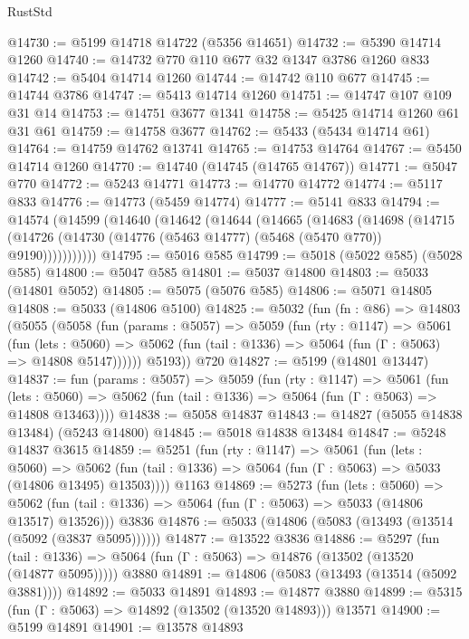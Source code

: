 \begin{lexlean}{RustStd}
\begin{coremodule}
@14730 := @5199 @14718 @14722 (@5356 @14651)
@14732 := @5390 @14714 @1260
@14740 := @14732 @770 @110 @677 @32 @1347 @3786 @1260 @833
@14742 := @5404 @14714 @1260
@14744 := @14742 @110 @677
@14745 := @14744 @3786
@14747 := @5413 @14714 @1260
@14751 := @14747 @107 @109 @31 @14
@14753 := @14751 @3677 @1341
@14758 := @5425 @14714 @1260 @61 @31 @61
@14759 := @14758 @3677
@14762 := @5433 (@5434 @14714 @61)
@14764 := @14759 @14762 @13741
@14765 := @14753 @14764
@14767 := @5450 @14714 @1260
@14770 := @14740 (@14745 (@14765 @14767))
@14771 := @5047 @770
@14772 := @5243 @14771
@14773 := @14770 @14772
@14774 := @5117 @833
@14776 := @14773 (@5459 @14774)
@14777 := @5141 @833
@14794 := @14574
    (@14599
      (@14640
        (@14642
          (@14644
            (@14665
              (@14683
                (@14698
                  (@14715
                    (@14726 (@14730 (@14776 (@5463 @14777) (@5468 (@5470 @770)) @9190)))))))))))
@14795 := @5016 @585
@14799 := @5018 (@5022 @585) (@5028 @585)
@14800 := @5047 @585
@14801 := @5037 @14800
@14803 := @5033 (@14801 @5052)
@14805 := @5075 (@5076 @585)
@14806 := @5071 @14805
@14808 := @5033 (@14806 @5100)
@14825 := @5032
    (fun (fn : @86) =>
    @14803
      (@5055
        (@5058
          (fun (params : @5057) =>
          @5059
            (fun (rty : @1147) =>
            @5061
              (fun (lets : @5060) =>
              @5062 (fun (tail : @1336) => @5064 (fun (Γ : @5063) => @14808 @5147))))))
        @5193))
    @720
@14827 := @5199 (@14801 @13447)
@14837 := fun (params : @5057) =>
  @5059
    (fun (rty : @1147) =>
    @5061
      (fun (lets : @5060) =>
      @5062 (fun (tail : @1336) => @5064 (fun (Γ : @5063) => @14808 @13463))))
@14838 := @5058 @14837
@14843 := @14827 (@5055 @14838 @13484) (@5243 @14800)
@14845 := @5018 @14838 @13484
@14847 := @5248 @14837 @3615
@14859 := @5251
    (fun (rty : @1147) =>
    @5061
      (fun (lets : @5060) =>
      @5062 (fun (tail : @1336) => @5064 (fun (Γ : @5063) => @5033 (@14806 @13495) @13503))))
    @1163
@14869 := @5273
    (fun (lets : @5060) =>
    @5062 (fun (tail : @1336) => @5064 (fun (Γ : @5063) => @5033 (@14806 @13517) @13526)))
    @3836
@14876 := @5033 (@14806 (@5083 (@13493 (@13514 (@5092 (@3837 @5095))))))
@14877 := @13522 @3836
@14886 := @5297
    (fun (tail : @1336) => @5064 (fun (Γ : @5063) => @14876 (@13502 (@13520 (@14877 @5095)))))
    @3880
@14891 := @14806 (@5083 (@13493 (@13514 (@5092 @3881))))
@14892 := @5033 @14891
@14893 := @14877 @3880
@14899 := @5315 (fun (Γ : @5063) => @14892 (@13502 (@13520 @14893))) @13571
@14900 := @5199 @14891
@14901 := @13578 @14893

\end{coremodule}
\end{lexlean}
